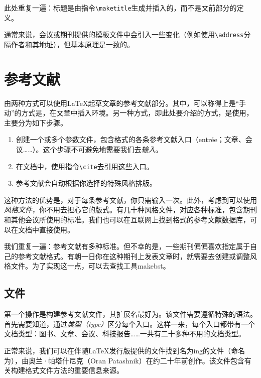 此处重复一遍：标题是由指令\verb|\maketitle|生成并插入的，而不是文前部分的定义。

通常来说，会议或期刊提供的模板文件中会引入一些变化（例如使用\verb|\address|分隔作者和其地址），但基本原理是一致的。

\section{参考文献}

由两种方式可以使用\LaTeX 起草文章的参考文献部分。其中，可以称得上是“手动”的方式是，在文章中插入环境。另一种方式，即此处要介绍的方式，是使用\bib ，主要分为如下步骤。

\begin{enumerate}
    \item 创建一个或多个参数文件，包含\bib 格式的各条参考文献入口（entrée；文章、会议……）。这个步骤不可避免地需要我们去\emph{输入}。
    \item 在文档中，使用指令\verb|\cite|去引用这些入口。
    \item 参考文献会自动根据你选择的特殊风格排版。
\end{enumerate}

这种方法的优势是，对于每条参考文献，你只需输入一次。此外，考虑到可以使用\emph{风格文件}，你不用去担心它的版式。有几十种风格文件，对应各种标准，包含期刊和其他会议所使用的标准。我们也可以在互联网上找到\bib 格式的参考文献数据库，可以在文档中直接使用。

我们重复一遍：参考文献有多种标准。但不幸的是，一些期刊偏偏喜欢指定属于自己的参考文献格式。有朝一日你在这种期刊上发表文章时，就需要去创建或调整风格文件。为了实现这一点，可以去查找工具\textsf{makebst}。

\subsection{文件}

第一个操作是构建参考文献文件，其扩展名最好为。该文件需要遵循特殊的语法。首先需要知道，\bib 通过\emph{类型（type）}区分每个入口。这样一来，每个入口都带有一个文档类型：图书、文章、会议、科技报告……一共有二十多种不用的文档类型。

\begin{ii}
正常来说，我们可以在伴随\LaTeX 发行版提供的文件找到名为\bib ing的文件（命名为），由奥兰·帕塔什尼克（Oran Patashnik）在约二十年前创作。该文件包含有关构建\bib 格式文件方法的重要信息来源。
\end{ii}

